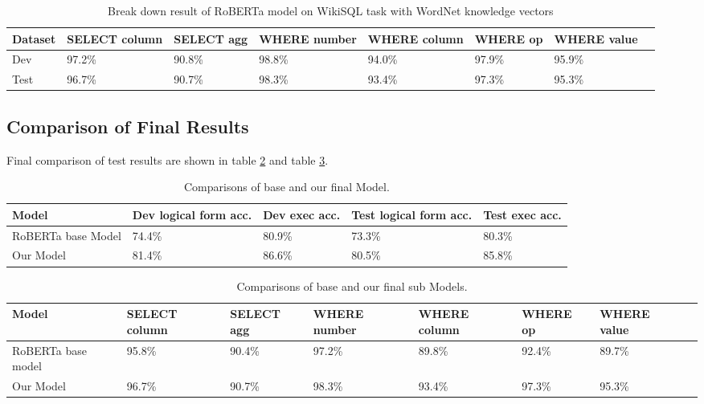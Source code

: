 \documentclass[12pt]{article}
\begin{document}
\begin{table}
\centering
 \begin{tabular}{| m{2cm} | m{2cm}| m{2cm} |m{2cm}| m{2cm} |m{2cm} | m{2cm} |m{2cm} |} 
 \hline
  Dataset & SELECT column & SELECT agg & WHERE number & WHERE column & WHERE op & WHERE value\\ 
 \hline\hline
  Dev & 97.2\% & 90.8\% & 98.8\% & 94.0\% & 97.9\% &  95.9\% \\ 
\hline
 Test & 96.7\% & 90.7\% & 98.3\% & 93.4\% & 97.3\% &  95.3\% \\ 
 \hline

\end{tabular}
\caption{Break down result of RoBERTa model on WikiSQL task with WordNet knowledge vectors}
\label{robertatabledetailedtwoheader}
\end{table}

\subsection{Comparison of Final Results}
Final comparison of test results are shown in table \ref{finalcomparisonmodel} and table \ref{finalcomparison}.


 \begin{table}
\centering
 \begin{tabular}{| m{2cm} | m{2cm}| m{2cm} |m{2cm}| m{2cm} |} 
 \hline
Model & Dev logical form acc. & Dev exec acc. & Test logical form acc. & Test exec acc. \\ 
 \hline\hline
   RoBERTa base Model & 74.4\% & 80.9\% & 73.3\% & 80.3\% \\ 
  Our Model & 81.4\% & 86.6\% & 80.5\% & 85.8\% \\ 
 \hline
\end{tabular}
\caption{Comparisons of base and our final Model.}
\label{finalcomparisonmodel}
\end{table}


\begin{table}
\centering
 \begin{tabular}{| m{2cm} | m{2cm}| m{2cm} |m{2cm}| m{2cm} |m{2cm} | m{2cm} |m{2cm} |} 
 \hline
  Model & SELECT column & SELECT agg & WHERE number & WHERE column & WHERE op & WHERE value\\ 
 \hline\hline
  RoBERTa base model & 95.8\% & 90.4\% & 97.2\% & 89.8\% & 92.4\% &  89.7\% \\ 
\hline
 Our Model &  96.7\% & 90.7\% & 98.3\% & 93.4\% & 97.3\% &  95.3\% \\ 
 \hline
\end{tabular}
\caption{Comparisons of base and our final sub Models.}
\label{finalcomparison}
\end{table}
\end{document}
